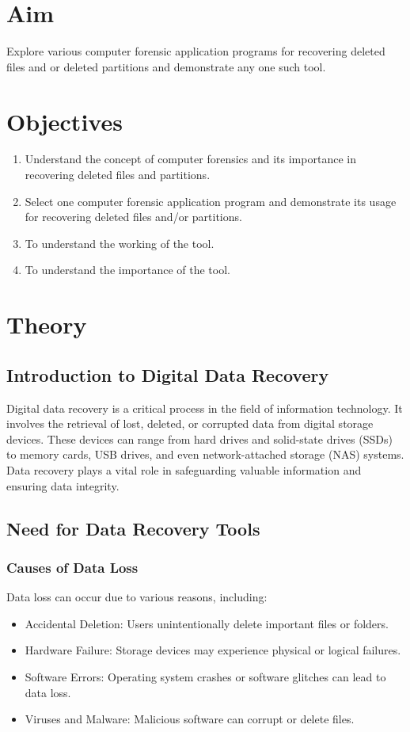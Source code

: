 \documentclass[11pt]{article}
\begin{document}
\tableofcontents
\thispagestyle{empty}
\clearpage

\setcounter{page}{1}

\section{Aim}
Explore various computer forensic application programs for recovering deleted files and or deleted partitions and demonstrate any one such tool.

\section{Objectives}
\begin{enumerate}
    \item Understand the concept of computer forensics and its importance in recovering deleted files and partitions.
    \item Select one computer forensic application program and demonstrate its usage for recovering deleted files and/or partitions.
    \item To understand the working of the tool.
    \item To understand the importance of the tool.
\end{enumerate}

\section{Theory}
\subsection{Introduction to Digital Data Recovery}
Digital data recovery is a critical process in the field of information technology. It involves the retrieval of lost, deleted, or corrupted data from digital storage devices. These devices can range from hard drives and solid-state drives (SSDs) to memory cards, USB drives, and even network-attached storage (NAS) systems. Data recovery plays a vital role in safeguarding valuable information and ensuring data integrity.

\subsection{Need for Data Recovery Tools}
\subsubsection{Causes of Data Loss}
Data loss can occur due to various reasons, including:
\begin{itemize}
    \item Accidental Deletion: Users unintentionally delete important files or folders.
    \item Hardware Failure: Storage devices may experience physical or logical failures.
    \item Software Errors: Operating system crashes or software glitches can lead to data loss.
    \item Viruses and Malware: Malicious software can corrupt or delete files.
\end{itemize}
\end{document}

